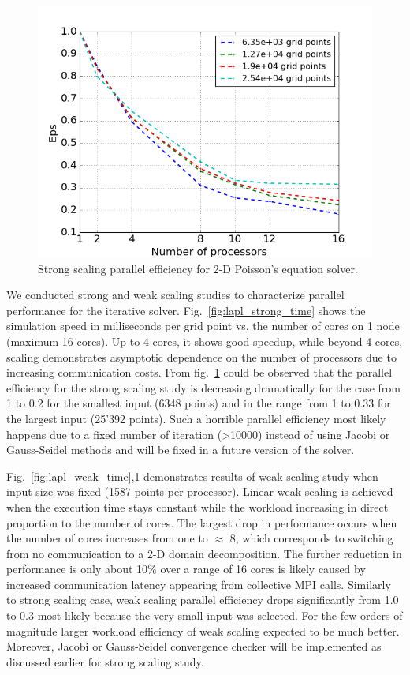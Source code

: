 \documentclass{anstrans}
\begin{document}
\begin{figure}[htpb!]
  \centering
  \includegraphics[width=\linewidth]{lapl_strong_eff.png}
  \caption{Strong scaling parallel efficiency for 2-D Poisson's equation solver.}
  \label{fig:lapl_strong_eff}
\end{figure}
\FloatBarrier

We conducted strong and weak scaling studies to characterize parallel performance for the iterative solver. Fig.~\ref{fig:lapl_strong_time} shows the simulation speed in milliseconds per grid point vs. the number of cores on 1 node (maximum 16 cores). Up to 4 cores, it shows good speedup, while beyond 4 cores, scaling demonstrates asymptotic dependence on the number of processors due to increasing
communication costs. From fig.~\ref{fig:lapl_strong_eff} could be observed that the parallel efficiency for the strong scaling study is decreasing dramatically for the case from 1 to 0.2 for the smallest input (6348 points) and in the range from 1 to 0.33 for the largest input (25'392 points). Such a horrible parallel efficiency most likely happens due to a fixed number of iteration (>10000) instead of using Jacobi or Gauss-Seidel methods and will be fixed in a future version of the solver.

Fig.~\ref{fig:lapl_weak_time},\ref{fig:lapl_strong_eff} demonstrates results of weak scaling study when input size was fixed (1587 points per processor). Linear weak scaling is achieved when the execution time stays constant while the workload increasing
in direct proportion to the number of cores. The largest drop in performance occurs when the number of cores increases from one to $\approx$ 8, which corresponds to switching from no communication to a 2-D domain decomposition. The further reduction in performance is only about 10\% over a range of 16 cores is likely caused by increased communication latency appearing from collective \gls{MPI} calls. Similarly to strong scaling case, weak scaling parallel efficiency drops significantly from 1.0 to 0.3 most likely because the very small input was selected. For the few orders of magnitude larger workload efficiency of weak scaling expected to be much better. Moreover, Jacobi or Gauss-Seidel convergence checker will be implemented as discussed earlier for strong scaling study.
\end{document}
